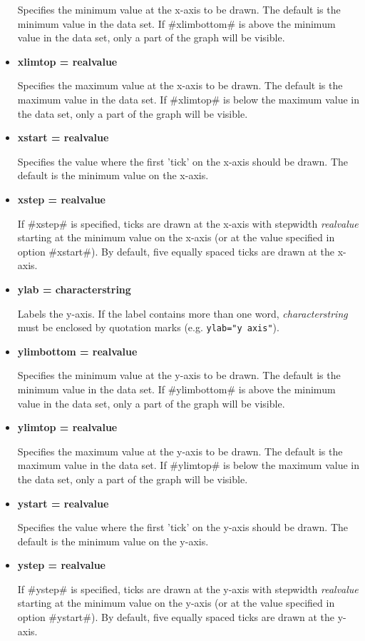 \begin{itemize}
Specifies the minimum value at the x-axis to be drawn. The default
is the minimum value in the data set. If #xlimbottom# is above the
minimum value in the data set, only a part of the  graph will be
visible.
\item {\bf xlimtop = realvalue}

Specifies the maximum value at the x-axis to be drawn. The default
is the maximum value in the data set. If #xlimtop# is below the
maximum value in the data set, only a part of the  graph will be
visible.
\item {\bf xstart = realvalue}

Specifies the value where the first 'tick' on the x-axis should be
drawn. The default is the minimum value on the x-axis.
\item {\bf xstep = realvalue}

If #xstep# is specified,  ticks are drawn at the x-axis with
stepwidth {\em realvalue} starting at the minimum value on the
x-axis (or at the value specified in option #xstart#). By default,
five equally spaced ticks are drawn at the x-axis. \item {\bf ylab
= characterstring}

Labels the y-axis. If the label contains more than one word, {\em
characterstring} must be enclosed by quotation marks (e.g.
\texttt{ylab="y axis"}). \item {\bf ylimbottom = realvalue}

Specifies the minimum value at the y-axis to be drawn. The default
is the minimum value in the data set. If #ylimbottom# is above the
minimum value in the data set, only a part of the  graph will be
visible. \item {\bf ylimtop = realvalue}

Specifies the maximum value at the y-axis to be drawn. The default
is the maximum value in the data set. If #ylimtop# is below the
maximum value in the data set, only a part of the  graph will be
visible.
\item {\bf ystart = realvalue}

Specifies the value where the first 'tick' on the y-axis should be
drawn. The default is the minimum value on the y-axis.
\item {\bf ystep = realvalue}

If #ystep# is specified,  ticks are drawn at the y-axis with
stepwidth {\em realvalue} starting at the minimum value on the
y-axis (or at the value specified in option #ystart#). By default,
five equally spaced ticks are drawn at the y-axis.
\end{itemize}

